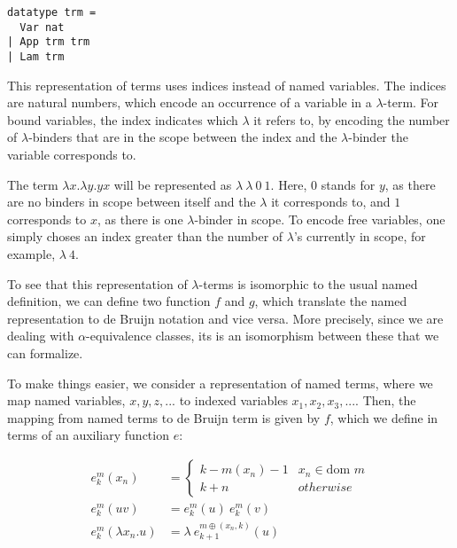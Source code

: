 \documentclass[a4paper, 12pt, twoside]{style/ociamthesis}
\theoremstyle{plain}
\theoremstyle{definition}
\newtheorem{Example}{Example}[chapter]
\theoremstyle{remark}
\renewenvironment{Example}{\begin{OldExample}\begin{mdframed}[style=example, linecolor=yellow]}{\end{mdframed}\end{OldExample}}
\begin{document}
\begin{verbatim}
datatype trm =
  Var nat
| App trm trm
| Lam trm
\end{verbatim}

This representation of terms uses indices instead of named variables.
The indices are natural numbers, which encode an occurrence of a
variable in a \(\lambda\)-term. For bound variables, the index indicates
which \(\lambda\) it refers to, by encoding the number of
\(\lambda\)-binders that are in the scope between the index and the
\(\lambda\)-binder the variable corresponds to.

\begin{Example}

The term \(\lambda x.\lambda y. yx\) will be represented as
\(\lambda\ \lambda\ 0\ 1\). Here, 0 stands for \(y\), as there are no
binders in scope between itself and the \(\lambda\) it corresponds to,
and \(1\) corresponds to \(x\), as there is one \(\lambda\)-binder in
scope. To encode free variables, one simply choses an index greater than
the number of \(\lambda\)'s currently in scope, for example,
\(\lambda\ 4\).

\end{Example}

To see that this representation of \(\lambda\)-terms is isomorphic to
the usual named definition, we can define two function \(f\) and \(g\),
which translate the named representation to de Bruijn notation and vice
versa. More precisely, since we are dealing with \(\alpha\)-equivalence
classes, its is an isomorphism between these that we can formalize.

To make things easier, we consider a representation of named terms,
where we map named variables, \(x, y, z,...\) to indexed variables
\(x_1,x_2,x_3,...\). Then, the mapping from named terms to de Bruijn
term is given by \(f\), which we define in terms of an auxiliary
function \(e\):

\vspace{-2em}\begin{align*} 
e_k^m(x_n) &= \begin{cases}
k-m(x_n)-1 & x_n \in \text{dom }m\\
k+n & otherwise
\end{cases}\\
e_k^m(uv) &= e_k^m(u)\ e_k^m(v)\\
e_k^m(\lambda x_n.u) &= \lambda\ e_{k+1}^{m \oplus (x_n,k)}(u)
\end{align*}
\end{document}
